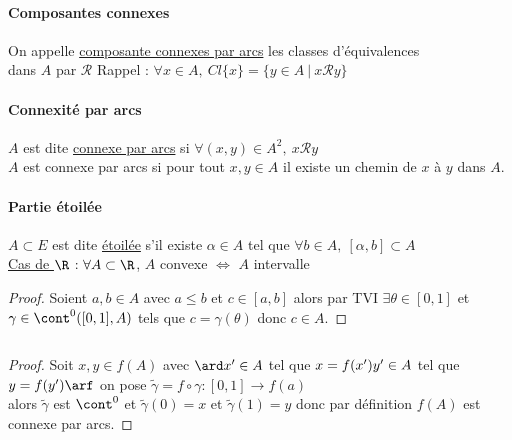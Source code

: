 		\paragraph{Composantes connexes} 
			On appelle \underline{composante connexes par arcs} les classes d'équivalences \\dans $A$ par $\mathcal{R}$ 
			\hspace*{1.5cm} Rappel :  $\forall x\in A ,~Cl\{x\} = \{y\in A ~|~ x\mathcal{R} y\}$ \trait ${}$ \vspace*{-1.5cm} \\ \traitd
		\paragraph{Connexité par arcs}
			$A$ est dite \underline{connexe par arcs} si $\forall (x,y) \in A^2 ,~x\mathcal{R} y$ \\$A$ est connexe par arcs si 
			pour tout $x,y \in A$ il existe un chemin de $x$ à $y$ dans $A$.	\trait
		 \traitd
		\paragraph{Partie étoilée}
			$A\subset E$ est dite \underline{étoilée} s'il existe $\alpha	\in A$ tel que $\forall b \in A ,~[\alpha ,b] \subset A$ \trait
		\\{\small \underline{Cas de $\R $} : $\forall A\subset \R $, $A$ convexe $\Leftrightarrow$ $A$ intervalle }
		\vspace*{0.5cm} \\ 
		\begin{proof}
		\fbox{$\Rightarrow$} Soient $a,b \in A$ avec $a\leq b$ et $c\in [a,b]$ alors par TVI $\exists \theta \in [0,1]$ et 
		$\gamma \in \cont^0([0,1],A)$ tels que $c=\gamma (\theta )$ donc $c\in A$.
		\end{proof}
		${}$ \\ 	
		\begin{proof}
		Soit $x,y \in f(A)$ avec $\ard x' \in A$ tel que $x=f(x') \\ y' \in A$ tel que $y=f(y') \arf $ on pose $\tilde{\gamma} = f\circ \gamma : 
		[0,1] \rightarrow f(a)$ \\alors $\tilde{\gamma}$ est $\cont^0$ et $\tilde{\gamma} (0) = x$ et $\tilde{\gamma} (1) = y$ donc par définition 
		$f(A)$ est connexe par arcs. 
		\end{proof} ${}$ \\
		\begin{center}
		\fin
		\end{center}